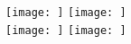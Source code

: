 
\begin{figure}[H]
\centering
	\subcaptionbox*{\label{subfig:}}%
		{\texttt{[image: ]}}%
\hfill
	\subcaptionbox*{\label{subfig:}}%
		{\texttt{[image: ]}}%
\\[\vbtwsfig]
	\subcaptionbox*{\label{subfig:}}%
		{\texttt{[image: ]}}%
\hfill
	\subcaptionbox*{\label{subfig:}}%
		{\texttt{[image: ]}}%
\caption*{}
\label{fig:}
\end{figure}
